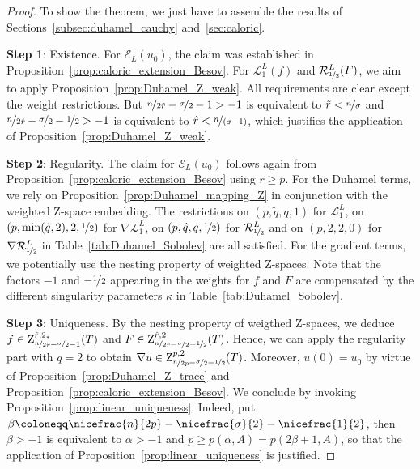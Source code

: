 \documentclass[11pt, leqno]{amsart}
\theoremstyle{definition}
\newcommand{\Z}{\mathrm{Z}}
\newcommand{\Ext}{\mathcal{E}}
\newcommand{\Sol}{\mathcal{R}}
\newcommand{\Soll}{\mathcal{L}}
\begin{document}
	\begin{proof}
		To show the theorem, we just have to assemble the results of Sections~\ref{subsec:duhamel_cauchy} and~\ref{sec:caloric}.

		\textbf{Step 1}: Existence. For $\Ext_L(u_0)$, the claim was established in Proposition~\ref{prop:caloric_extension_Besov}. For $\Soll^L_1(f)$ and $\Sol^L_{\nicefrac{1}{2}}(F)$, we aim to apply Proposition~\ref{prop:Duhamel_Z_weak}. All requirements are clear except the weight restrictions. But $\nicefrac{n}{2\tilde r} - \nicefrac{\sigma}{2} - 1 > -1$ is equivalent to $\tilde r < \nicefrac{n}{\sigma}$ and $\nicefrac{n}{2\hat r} - \nicefrac{\sigma}{2} - \nicefrac{1}{2} > -1$ is equivalent to $\hat r < \nicefrac{n}{(\sigma-1)}$, which justifies the application of Proposition~\ref{prop:Duhamel_Z_weak}.

		\textbf{Step 2}: Regularity. The claim for $\Ext_L(u_0)$ follows again from Proposition~\ref{prop:caloric_extension_Besov} using $r \geq p$. For the Duhamel terms, we rely on Proposition~\ref{prop:Duhamel_mapping_Z} in conjunction with the weighted $\Z$-space embedding. The restrictions
		on $(p,\tilde q,q,1) $ for $\Soll^L_1$,
		on $(p,\min(\tilde q,2),2, \nicefrac1 2) $ for $\nabla \Soll^L_1$,
		on $(p, \hat q, q, \nicefrac1 2)$ for $\Sol^L_{\nicefrac{1}{2}}$ and on $(p, 2, 2, 0)$ for $\nabla \Sol^L_{\nicefrac{1}{2}}$
		in Table~\ref{tab:Duhamel_Sobolev} are all satisfied. For the gradient terms, we potentially use the nesting property of weighted $\Z$-spaces. Note that the factors $-1$ and $-\nicefrac{1}{2}$ appearing in the weights for $f$ and $F$ are compensated by the different singularity parameters $\kappa$ in Table~\ref{tab:Duhamel_Sobolev}.

		\textbf{Step 3}: Uniqueness. By the nesting property of weigthed $\Z$-spaces, we deduce $f \in \Z^{\tilde r, 2_*}_{\nicefrac{n}{2\tilde r} - \nicefrac{\sigma}{2} - 1}(T)$ and $F \in \Z^{\hat r, 2}_{\nicefrac{n}{2\hat r} - \nicefrac{\sigma}{2} - \nicefrac{1}{2}}(T)$. Hence, we can apply the regularity part with $q = 2$ to obtain $\nabla u \in \Z^{p,2}_{\nicefrac{n}{2p} - \nicefrac{\sigma}{2} - \nicefrac{1}{2}}(T)$. %
		Moreover, $u(0) = u_0$ by virtue of Proposition~\ref{prop:Duhamel_Z_trace} and Proposition~\ref{prop:caloric_extension_Besov}.
		We conclude by invoking Proposition~\ref{prop:linear_uniqueness}. Indeed, put $\beta \coloneqq \nicefrac{n}{2p} - \nicefrac{\sigma}{2} - \nicefrac{1}{2}$, then $\beta > -1$ is equivalent to $\alpha > -1$ and $p \geq p(\alpha,A) = p(2\beta + 1, A)$, so that the application of Proposition~\ref{prop:linear_uniqueness} is justified.
	\end{proof}
\end{document}
